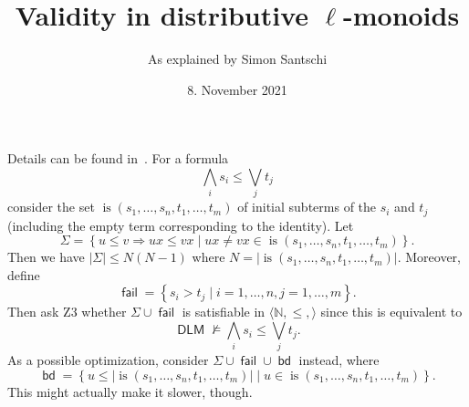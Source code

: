 \documentclass[a4paper]{article}
\title{Validity in distributive $\ell$-monoids}
\author{As explained by Simon Santschi}
\date{8. November 2021}
\theoremstyle{definition}
\DeclareMathOperator{\is}{\text{is}}
\DeclareMathOperator{\fail}{\mathsf{fail}}
\DeclareMathOperator{\DLM}{\mathsf{DLM}}
\DeclareMathOperator{\bd}{\mathsf{bd}}
\begin{document}
\maketitle

Details can be found in~\cite{backagain}.
For a formula
\[
  \bigwedge_{i} s_i \leq \bigvee_j t_j
\]
consider the set $\is(s_1, \dots, s_n, t_1, \dots, t_m)$ 
of initial subterms of the $s_i$ and $t_j$ (including the empty term corresponding to the identity).
Let
\[
  \Sigma =
  \left\{u \leq v \Rightarrow ux \leq vx \mid ux \neq vx \in 
  \is(s_1, \dots, s_n, t_1, \dots, t_m)\right\}.
\]
Then we have $|\Sigma| \leq N(N-1)$ where $N = |\is(s_1, \dots, s_n, t_1, \dots, t_m)|$.
Moreover, define
\[
  \fail =
  \left\{s_i > t_j \mid i = 1, \dots, n, j = 1, \dots, m\right\}.
\]
Then ask Z3 whether $\Sigma \cup \fail$ is satisfiable in $\langle \mathbb N, \leq, \rangle$ since
this is equivalent to
\[
  \DLM \not\models 
  \bigwedge_{i} s_i \leq \bigvee_j t_j.
\]
As a possible optimization, consider $\Sigma \cup \fail \cup \bd$
instead, where
\[
   \bd = \left\{u \leq |\is(s_1, \dots, s_n, t_1, \dots, t_m)| \mid 
   u \in \is(s_1, \dots, s_n, t_1, \dots, t_m)\right\}.
\]
This might actually make it slower, though.





\end{document}
